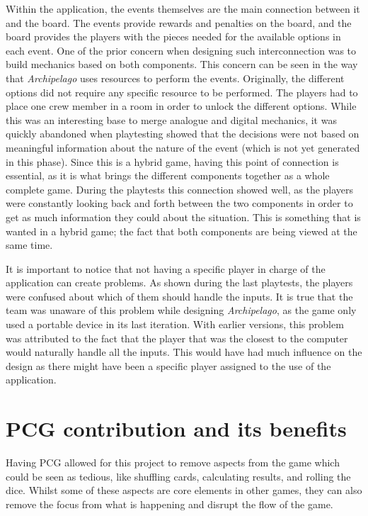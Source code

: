 Within the application, the events themselves are the main connection between it and the board. The events provide rewards and penalties on the board, and the board provides the players with the pieces needed for the available options in each event. One of the prior concern when designing such interconnection was to build mechanics based on both components. This concern can be seen in the way that \textit{Archipelago} uses resources to perform the events. Originally, the different options did not require any specific resource to be performed. The players had to place one crew member in a room in order to unlock the different options. While this was an interesting base to merge analogue and digital mechanics, it was quickly abandoned when playtesting showed that the decisions were not based on meaningful information about the nature of the event (which is not yet generated in this phase). 
Since this is a hybrid game, having this point of connection is essential, as it is what brings the different components together as a whole complete game. During the playtests this connection showed well, as the players were constantly looking back and forth between the two components in order to get as much information they could about the situation. This is something that is wanted in a hybrid game; the fact that both components are being viewed at the same time. 


It is important to notice that not having a specific player in charge of the application can create problems. As shown during the last playtests, the players were confused about which of them should handle the inputs. It is true that the team was unaware of this problem while designing \textit{Archipelago}, as the game only used a portable device in its last iteration. With earlier versions, this problem was attributed to the fact that the player that was the closest to the computer would naturally handle all the inputs. This would have had much influence on the design as there might have been a specific player assigned to the use of the application. 

\section{PCG contribution and its benefits}
\label{sec:pcgben}
Having PCG allowed for this project to remove aspects from the game which could be seen as tedious, like shuffling cards, calculating results, and rolling the dice. Whilst some of these aspects are core elements in other games, they can also remove the focus from what is happening and disrupt the flow of the game.

